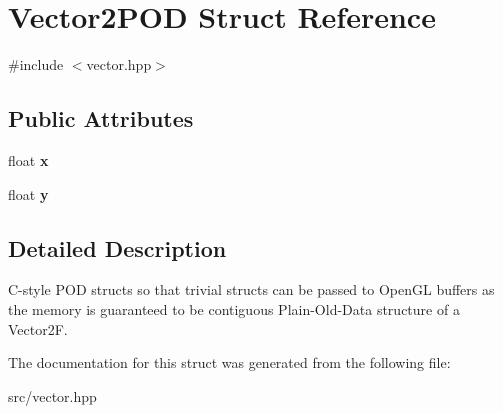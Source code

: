 \hypertarget{struct_vector2_p_o_d}{}\section{Vector2\+P\+OD Struct Reference}
\label{struct_vector2_p_o_d}


{\ttfamily \#include $<$vector.\+hpp$>$}

\subsection*{Public Attributes}
\begin{DoxyCompactItemize}
\item 
\mbox{\label{struct_vector2_p_o_d_aae469724c8da4468de3ac9415c75465e}} 
float {\bfseries x}
\item 
\mbox{\label{struct_vector2_p_o_d_a8ed0fe76a28039ddae57d8bda8bf2970}} 
float {\bfseries y}
\end{DoxyCompactItemize}


\subsection{Detailed Description}
C-\/style P\+OD structs so that trivial structs can be passed to Open\+GL buffers as the memory is guaranteed to be contiguous Plain-\/\+Old-\/\+Data structure of a Vector2F. 

The documentation for this struct was generated from the following file\+:\begin{DoxyCompactItemize}
\item 
src/vector.\+hpp\end{DoxyCompactItemize}
